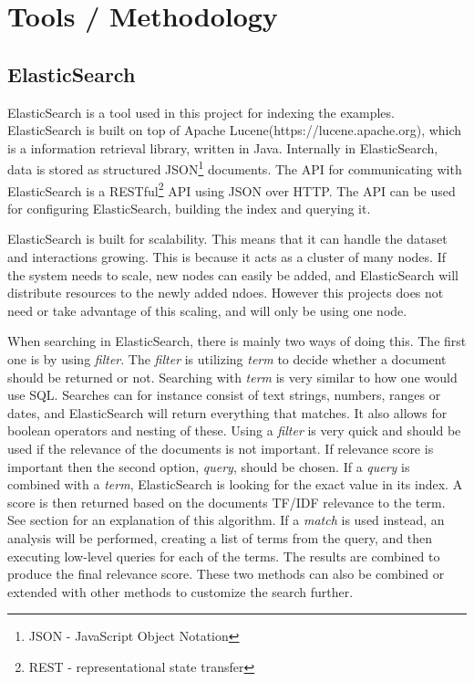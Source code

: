 \section{Tools / Methodology}

\subsection{ElasticSearch} \label{elasticsearch}
ElasticSearch is a tool used in this project for indexing the examples. ElasticSearch is built on top of Apache Lucene(https://lucene.apache.org), which is a information retrieval library, written in Java. Internally in ElasticSearch, data is stored as structured JSON\footnote{JSON - JavaScript Object Notation} documents. The API for communicating with ElasticSearch is a RESTful\footnote{REST - representational state transfer} API using JSON over HTTP. The API can be used for configuring ElasticSearch, building the index and querying it. 

ElasticSearch is built for scalability. This means that it can handle the dataset and interactions growing. This is because it acts as a cluster of many nodes. If the system needs to scale, new nodes can easily be added, and ElasticSearch will distribute resources to the newly added ndoes. However this projects does not need or take advantage of this scaling, and will only be using one node.

When searching in ElasticSearch, there is mainly two ways of doing this. The first one is by using \textit{filter}. The \textit{filter} is utilizing \textit{term} to decide whether a document should be returned or not. Searching with \textit{term} is very similar to how one would use SQL. %
Searches can for instance consist of text strings, numbers, ranges or dates, and ElasticSearch will return everything that matches. It also allows for boolean operators and nesting of these. Using a \textit{filter} is very quick and should be used if the relevance of the documents is not important. If relevance score is important then the second option, \textit{query}, should be chosen. If a \textit{query} is combined with a \textit{term}, ElasticSearch is looking for the exact value in its index. A score is then returned based on the documents TF/IDF relevance to the term. See section \label{tfidf} for an explanation of this algorithm.%
If a \textit{match} is used instead, an analysis will be performed, creating a list of terms from the query, and then executing low-level queries for each of the terms. The results are combined to produce the final relevance score. These two methods can also be combined or extended with other methods to customize the search further.


